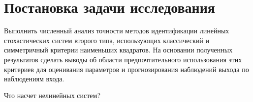 \section{Постановка задачи исследования}

Выполнить численный анализ точности методов идентификации
линейных стохастических систем второго типа,
использующих классический и симметричный критерии наименьших квадратов.
На основании полученных результатов сделать выводы об области предпочтительного
использования этих критериев для оценивания параметров и
прогнозирования наблюдений выхода по наблюдениям входа.

{\color{red} Что насчет нелинейных систем?}




